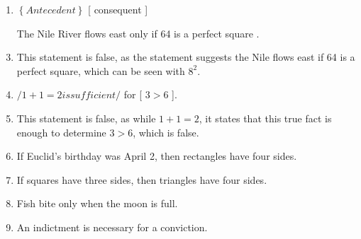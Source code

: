 \documentclass{letter}
\begin{document}
\begin{description}
\begin{enumerate}
\begin{enumerate}
                        \item $ \left\{Antecedent \right\}$ [ consequent ]
			\item [The Nile River flows east] only if { 64 is a perfect square }. \\ 
                        \item This statement is false, as the statement suggests the Nile flows east if 64 is a perfect square, which can be seen with $8^2$. \\ 
			\item $/{1+1=2 is sufficient/}$ for [ $3>6$ ]. \\ 
                        \item This statement is false, as while $1+1=2$, it states that this true fact is enough to determine $3>6$, which is false. \\
			\item If Euclid's birthday was April 2, then rectangles have four sides. \\
			\item If squares have three sides, then triangles have four sides. \\
			\item Fish bite only when the moon is full. \\
			\item An indictment is necessary for a conviction. \\
	                  

\end{enumerate}
\end{enumerate}
\end{description}
\end{document}
